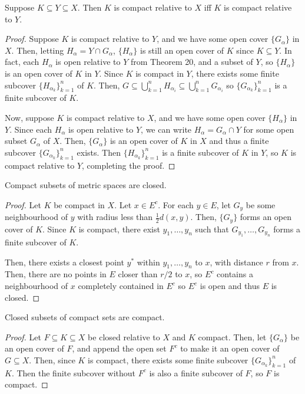 \begin{theorem}
Suppose $K \subseteq Y \subseteq X$. Then $K$ is compact relative to $X$ iff $K$ is compact relative to $Y$.

\begin{proof}
Suppose $K$ is compact relative to $Y$, and we have some open cover $\{G_\alpha\}$ in $X$. Then, letting $H_\alpha = Y \cap G_\alpha$, $\{H_\alpha\}$ is still an open cover of $K$ since $K \subseteq Y$. In fact, each $H_\alpha$ is open relative to $Y$ from Theorem 20, and a subset of $Y$, so $\{H_\alpha\}$ is an open cover of $K$ in $Y$. Since $K$ is compact in $Y$, there exists some finite subcover $\{H_{\alpha_k}\}_{k=1}^{n}$ of $K$. Then, $G \subseteq \bigcup_{k=1}^{n} H_{\alpha_i} \subseteq \bigcup_{k=1}^{n} G_{\alpha_i}$ so $\{G_{\alpha_k}\}_{k=1}^{n}$ is a finite subcover of $K$. 

Now, suppose $K$ is compact relative to $X$, and we have some open cover $\{H_\alpha\}$ in $Y$. Since each $H_\alpha$ is open relative to $Y$, we can write $H_\alpha = G_\alpha \cap Y$ for some open subset $G_\alpha$ of $X$. Then, $\{G_\alpha\}$ is an open cover of $K$ in $X$ and thus a finite subcover $\{G_{\alpha_k}\}_{k=1}^{n}$ exists. Then $\{H_{\alpha_k}\}_{k=1}^{n}$ is a finite subcover of $K$ in $Y$, so $K$ is compact relative to $Y$, completing the proof.
\end{proof}
\end{theorem}

\begin{theorem}
Compact subsets of metric spaces are closed.

\begin{proof}
Let $K$ be compact in $X$. Let $x \in E^c$. For each $y \in E$, let $G_y$ be some neighbourhood of $y$ with radius less than $\frac12 d(x, y)$. Then, $\{G_y\}$ forms an open cover of $K$. Since $K$ is compact, there exist $y_1, \dotsc, y_n$ such that $G_{y_1}, \dotsc, G_{y_n}$ forms a finite subcover of $K$. 

Then, there exists a closest point $y^*$ within $y_1, \dotsc, y_n$ to $x$, with distance $r$ from $x$. Then, there are no points in $E$ closer than $r/2$ to $x$, so $E^c$ contains a neighbourhood of $x$ completely contained in $E^c$ so $E^c$ is open and thus $E$ is closed.
\end{proof}
\end{theorem}

\begin{theorem}
Closed subsets of compact sets are compact.

\begin{proof}
Let $F \subseteq K \subseteq X$ be closed relative to $X$ and $K$ compact. Then, let $\{G_\alpha\}$ be an open cover of $F$, and append the open set $F^c$ to make it an open cover of $G \subseteq X$. Then, since $K$ is compact, there exists some finite subcover $\{G_{\alpha_k}\}_{k=1}^{n}$ of $K$. Then the finite subcover without $F^c$ is also a finite subcover of $F$, so $F$ is compact.
\end{proof}
\end{theorem}

